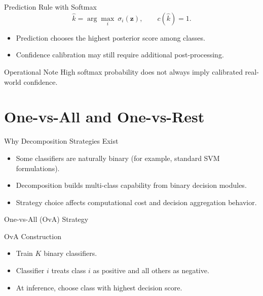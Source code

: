 \documentclass[10pt]{beamer}
\begin{document}
\begin{frame}{Prediction Rule with Softmax}
  \justifying
  \[
    \hat{k}=\arg\max_i\ \sigma_i(\bm{z}),
    \qquad
    c(\hat{k})=1.
  \]
  \begin{itemize}
    \item Prediction chooses the highest posterior score among classes.
    \item Confidence calibration may still require additional post-processing.
  \end{itemize}
  \begin{warningbox}{Operational Note}
    High softmax probability does not always imply calibrated real-world confidence.
  \end{warningbox}
\end{frame}

\section{One-vs-All and One-vs-Rest}

\begin{frame}{Why Decomposition Strategies Exist}
  \justifying
  \begin{itemize}
    \item Some classifiers are naturally binary (for example, standard SVM formulations).
    \item Decomposition builds multi-class capability from binary decision modules.
    \item Strategy choice affects computational cost and decision aggregation behavior.
  \end{itemize}
\end{frame}

\begin{frame}{One-vs-All (OvA) Strategy}
  \justifying
  \begin{conceptbox}{OvA Construction}
    \begin{itemize}
      \item Train $K$ binary classifiers.
      \item Classifier $i$ treats class $i$ as positive and all others as negative.
      \item At inference, choose class with highest decision score.
    \end{itemize}
  \end{conceptbox}
\end{frame}
\end{document}

